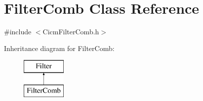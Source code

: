 \hypertarget{class_filter_comb}{\section{Filter\-Comb Class Reference}
\label{class_filter_comb}
}


{\ttfamily \#include $<$Cicm\-Filter\-Comb.\-h$>$}

Inheritance diagram for Filter\-Comb\-:\begin{figure}[H]
\begin{center}
\leavevmode
\includegraphics[height=2.000000cm]{class_filter_comb}
\end{center}
\end{figure}
